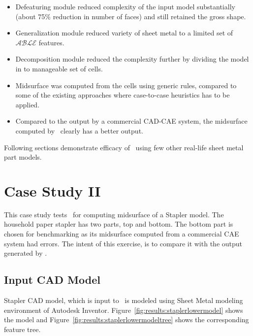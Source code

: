 \begin{itemize}[noitemsep,topsep=2pt,parsep=2pt,partopsep=2pt]
\item Defeaturing module reduced complexity of the input model substantially (about 75\% reduction in number of faces) and still retained the gross shape.
\item Generalization module reduced variety of sheet metal to a limited set of $\mathcal{ABLE}$ features.
\item Decomposition module reduced the complexity further by dividing the model in to manageable set of cells.
\item Midsurface was computed from the cells using generic rules, compared to some of the existing approaches where case-to-case heuristics has to be applied.
\item Compared to the output by a commercial CAD-CAE system, the midsurface computed by \mysystemname~clearly has a better output.
\end{itemize}


Following sections demonstrate efficacy of \mysystemname~using few other real-life sheet metal part models.

\section{Case Study II}

This case study tests \mysystemname~for computing midsurface of a Stapler model. The household paper stapler has two parts, top and bottom. The bottom part is chosen for benchmarking as its midsurface computed from a commercial CAE system had errors. The intent of this exercise, is to compare it with the output generated by \mysystemname.


\subsection{Input CAD Model}

Stapler CAD model, which is input to \mysystemname~is modeled using Sheet Metal modeling environment of Autodesk Inventor.  Figure~\ref{fig:results:staplerlowermodel} shows the model and Figure~\ref{fig:results:staplerlowermodeltree} shows the corresponding feature tree.



